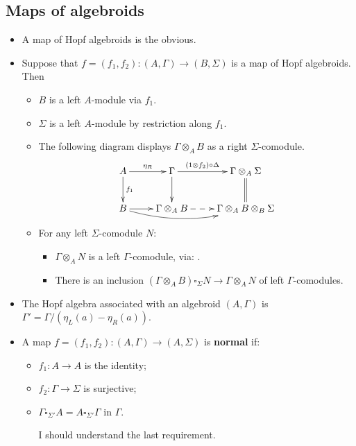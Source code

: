 \documentclass[11pt]{article}
\begin{document}
\begin{Maps of algebroids}
\subsection*{Maps of algebroids}
\begin{itemize}\squishlist
\item A map of Hopf algebroids is the obvious.
\item Suppose that $f=(f_1,f_2):(A,\Gamma)\to(B,\Sigma)$ is a map of Hopf algebroids. Then
\begin{itemize}\squishlist
\item $B$ is a left $A$-module via $f_1$.
\item $\Sigma$ is a left $A$-module by restriction along $f_1$.
\item
The following diagram displays $\Gamma\otimes_A B$ as a right $\Sigma$-comodule.
\[\xymatrix{
A\ar[r]^-{\eta_R}\ar[d]^-{f_1}&%
\Gamma\ar[d]\ar[r]^-{(1\otimes f_2)\circ\Delta}&%
\Gamma\otimes_A\Sigma\ar@{=}[d]\\%
B\ar@/_1em/[rr]\ar[r]&%
\Gamma\otimes_AB\ar@{-->}[r]&%
\Gamma\otimes_A B\otimes_B\Sigma
}\]
\item For any left $\Sigma$-comodule $N$:
\begin{itemize}\squishlist
\item  $\Gamma\otimes_AN$ is a left $\Gamma$-comodule, via: %
.
\item There is an inclusion $(\Gamma\otimes_AB)\square_\Sigma N\to\Gamma\otimes_AN$ of left $\Gamma$-comodules.
\end{itemize}

\end{itemize}
\item The Hopf algebra associated with an algebroid $(A,\Gamma)$ is $\Gamma'=\Gamma/(\eta_L(a)-\eta_R(a))$.
\item A map $f=(f_1,f_2):(A,\Gamma)\to(A,\Sigma)$ is \textbf{normal} if:
\begin{itemize}\squishlist
\item $f_1:A\to A$ is the identity;
\item $f_2:\Gamma\to\Sigma$ is surjective;
\item $\Gamma\square_{\Sigma'}A=A\square_{\Sigma'}\Gamma$ in $\Gamma$.
\begin{shaded}
I should understand the last requirement.
\end{shaded}
\end{itemize}

\end{itemize}

\end{Maps of algebroids}
\end{document}
